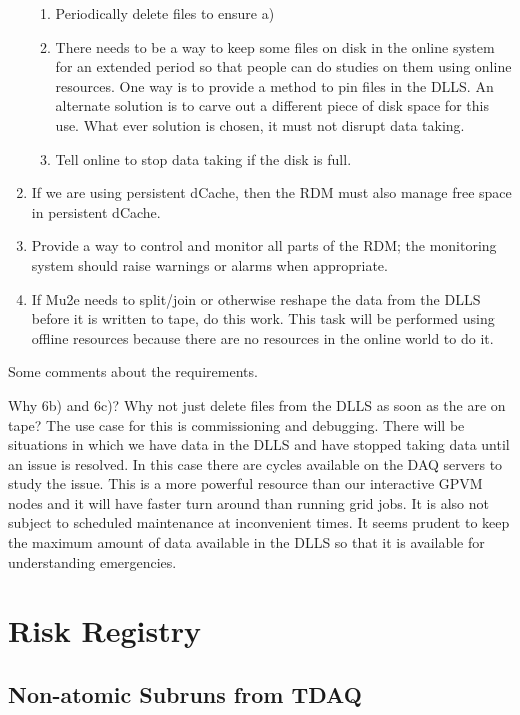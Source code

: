 \begin{enumerate}
\begin{enumerate}
   \item Periodically delete files to ensure a)
   \item There needs to be a way to keep some files on disk in the online system for an extended period so that
     people can do studies on them using online resources. One way is to provide
     a method to pin files in the DLLS.  An alternate solution is to carve out a different piece of disk
     space for this use.
     What ever solution is chosen, it must not disrupt data taking.
   \item Tell online to stop data taking if the disk is full.
  \end{enumerate}
\item If we are using persistent dCache, then the RDM must also manage free space in persistent dCache.
\item Provide a way to control and monitor all parts of the RDM; the monitoring system should raise warnings or alarms when appropriate.
\item If Mu2e needs to split/join or otherwise reshape the data from the DLLS before it is written to tape, do this work.
    This task will be performed using offline resources because there are no resources in the online world to do it.
\end{enumerate}

Some comments about the requirements.

Why 6b) and 6c)?
Why not just delete files from the DLLS as soon as the are on tape?
The use case for this is commissioning and debugging.
There will be situations in which we have data in the DLLS and have stopped taking data
until an issue is resolved.
In this case there are cycles available on the DAQ servers to study the issue.
This is a more powerful resource than our interactive GPVM nodes and
it will have faster turn around than running grid jobs.
It is also not subject to scheduled maintenance at inconvenient times.
It seems prudent to keep the maximum amount of data available in the DLLS so that
it is available for understanding emergencies.


\chapter{Risk Registry}
\label{ch:RiskRegistry}

\section{Non-atomic Subruns from TDAQ}
\label{sec:Risk:NonAtomicSubruns}

